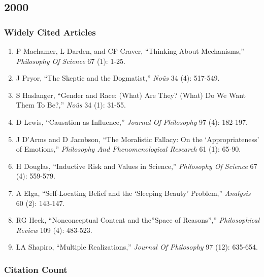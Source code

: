 \documentclass[
  10pt,
  letterpaper,
  DIV=11,
  numbers=noendperiod,
  twoside]{scrartcl}
\providecommand{\tightlist}{%
  \setlength{\itemsep}{0pt}\setlength{\parskip}{0pt}}\usepackage{longtable,booktabs,array}
\begin{document}
\newpage

\subsection{2000}\label{sec-s2000}

\subsubsection*{Widely Cited Articles}\label{widely-cited-articles-24}

\begin{enumerate}
\def\labelenumi{\arabic{enumi}.}
\tightlist
\item
  P Machamer, L Darden, and CF Craver, ``Thinking About Mechanisms,''
  \emph{Philosophy Of Science} 67 (1): 1-25.
\item
  J Pryor, ``The Skeptic and the Dogmatist,'' \emph{Noûs} 34 (4):
  517-549.
\item
  S Haslanger, ``Gender and Race: (What) Are They? (What) Do We Want
  Them To Be?,'' \emph{Noûs} 34 (1): 31-55.
\item
  D Lewis, ``Causation as Influence,'' \emph{Journal Of Philosophy} 97
  (4): 182-197.
\item
  J D'Arms and D Jacobson, ``The Moralistic Fallacy: On the
  `Appropriateness' of Emotions,'' \emph{Philosophy And Phenomenological
  Research} 61 (1): 65-90.
\item
  H Douglas, ``Inductive Risk and Values in Science,'' \emph{Philosophy
  Of Science} 67 (4): 559-579.
\item
  A Elga, ``Self-Locating Belief and the `Sleeping Beauty' Problem,''
  \emph{Analysis} 60 (2): 143-147.
\item
  RG Heck, ``Nonconceptual Content and the''Space of Reasons'',''
  \emph{Philosophical Review} 109 (4): 483-523.
\item
  LA Shapiro, ``Multiple Realizations,'' \emph{Journal Of Philosophy} 97
  (12): 635-654.
\end{enumerate}

\subsubsection*{Citation Count}\label{sec-count-2000}
\end{document}

